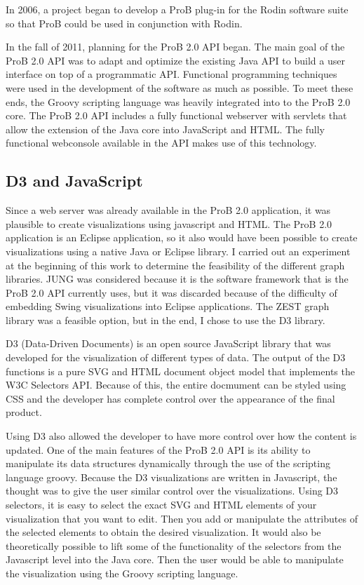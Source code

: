 In 2006, a project began to develop a ProB plug-in for the Rodin software suite so that ProB could be used in conjunction with Rodin. 

In the fall of 2011, planning for the ProB 2.0 API began.  The main goal of the ProB 2.0 API was to adapt and optimize the existing Java API to build a user interface on top of a programmatic API. Functional programming techniques were used in the development of the software as much as possible. To meet these ends, the Groovy scripting language was heavily integrated into to the ProB 2.0 core. The ProB 2.0 API includes a fully functional webserver with servlets that allow the extension of the Java core into JavaScript and HTML. The fully functional webconsole available in the API makes use of this technology.

\subsection{D3 and JavaScript}

Since a web server was already available in the ProB 2.0 application, it was plausible to create visualizations using javascript and HTML. The ProB 2.0 application is an Eclipse application, so it also would have been possible to create visualizations using a native Java or Eclipse library. I carried out an experiment at the beginning of this work to determine the feasibility of the different graph libraries. JUNG was considered because it is the software framework that is the ProB 2.0 API currently uses, but it was discarded because of the difficulty of embedding Swing visualizations into Eclipse applications. The ZEST graph library was a feasible option, but in the end, I chose to use the D3 library. 

D3 (Data-Driven Documents) is an open source JavaScript library that was developed for the visualization of different types of data. The output of the D3 functions is a pure SVG and HTML document object model that implements the W3C Selectors API. Because of this, the entire docmument can be styled using CSS and the developer has complete control over the appearance of the final product. 

Using D3 also allowed the developer to have more control over how the content is updated. One of the main features of the ProB 2.0 API is its ability to manipulate its data structures dynamically through the use of the scripting language groovy. Because the D3 visualizations are written in Javascript, the thought was to give the user similar control over the visualizations. Using D3 selectors, it is easy to select the exact SVG and HTML elements of your visualization that you want to edit. Then you add or manipulate the attributes of the selected elements to obtain the desired visualization. It would also be theoretically possible to lift some of the functionality of the selectors from the Javascript level into the Java core. Then the user would be able to manipulate the visualization using the Groovy scripting language.

